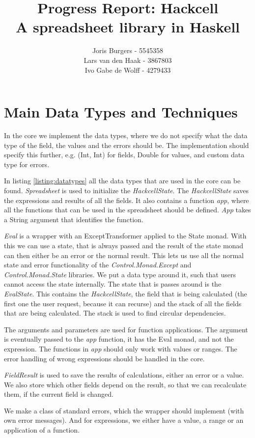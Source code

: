 \documentclass{article}
\title{
	Progress Report: Hackcell \\
	\vskip 0.5cm
	\large{A spreadsheet library in Haskell}
}
\author{Joris Burgers - 5545358\\ Lars van den Haak - 3867803\\ Ivo Gabe de Wolff - 4279433}
\begin{document}
	\maketitle
	\section{Main Data Types and Techniques}
	In the core we implement the data types, where we do not specify what the data type of the field, the values and the errors should be. The implementation should specify this further, e.g. (Int, Int) for fields, Double for values, and custom data type for errors.
	
	In listing \ref{listing:datatypes} all the data types that are used in the core can be found. \textit{Spreadsheet} is used to initialize the \textit{HackcellState}. The \textit{HackcellState} saves the expressions and results of all the fields. It also contains a function \textit{app}, where all the functions that can be used in the spreadsheet should be defined. \textit{App} takes a String argument that identifies the function.
	
	\textit{Eval} is a wrapper with an ExceptTransformer applied to the State monad. With this we can use a state, that is always passed and the result of the state monad can then either be an error or the normal result. This lets us use all the normal state and error functionality of the \textit{Control.Monad.Except} and \textit{Control.Monad.State} libraries. We put a data type around it, such that users cannot access the state internally. The state that is passes around is the \textit{EvalState}. This contains the \textit{HackcellState}, the field that is being calculated (the first one the user request, because it can recurse) and the stack of all the fields that are being calculated. The stack is used to find circular dependencies.
	
	The arguments and parameters are used for function applications. The argument is eventually passed to the \textit{app} function, it has the Eval monad, and not the expression. The functions in \textit{app} should only work with values or ranges. The error handling of wrong expressions should be handled in the core.
	
	\textit{FieldResult} is used to save the results of calculations, either an error or a value. We also store which other fields depend on the result, so that we can recalculate them, if the current field is changed.
	
	We make a class of standard errors, which the wrapper should implement (with own error messages). And for expressions, we either have a value, a range or an application of a function.
	
\end{document}
